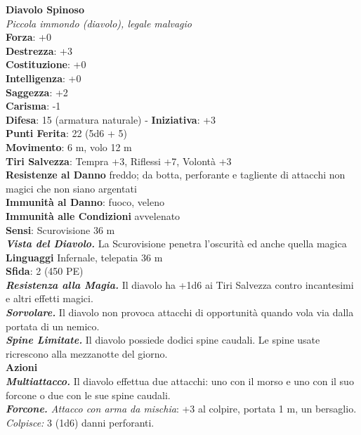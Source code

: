 \begin{multicols}{2}
\medskip\textbf{Diavolo Spinoso}\\
\emph{Piccola immondo (diavolo), legale malvagio}\\
\textbf{Forza}: +0\\
\textbf{Destrezza}: +3\\
\textbf{Costituzione}: +0\\
\textbf{Intelligenza}: +0\\
\textbf{Saggezza}: +2\\
\textbf{Carisma}: -1\\
\textbf{Difesa}: 15 (armatura naturale) - \textbf{Iniziativa}: +3\\
\textbf{Punti Ferita}: 22 (5d6 + 5)\\
\textbf{Movimento}: 6 m, volo 12 m\\
\textbf{Tiri Salvezza}: Tempra +3, Riflessi +7, Volontà +3\\
\textbf{Resistenze al Danno} freddo; da botta, perforante e tagliente di attacchi non magici che non siano argentati\\
\textbf{Immunità al Danno}: fuoco, veleno \\
\textbf{Immunità alle Condizioni} avvelenato\\
\textbf{Sensi}: Scurovisione 36 m\\
\emph{\textbf{Vista del Diavolo.}} La Scurovisione penetra l'oscurità ed anche quella magica\\
\textbf{Linguaggi} Infernale, telepatia 36 m \\
\textbf{Sfida}: 2 (450 PE)\smallskip\\
\emph{\textbf{Resistenza alla Magia.}} Il diavolo ha +1d6 ai Tiri Salvezza contro incantesimi e altri effetti magici.\\
\emph{\textbf{Sorvolare.}} Il diavolo non provoca attacchi di opportunità quando vola via dalla portata di un nemico.\\
\emph{\textbf{Spine Limitate.}} Il diavolo possiede dodici spine caudali. Le spine usate ricrescono alla mezzanotte del giorno.\\
\smallskip\textbf{Azioni}\\
\emph{\textbf{Multiattacco.}} Il diavolo effettua due attacchi: uno con il morso e uno con il suo forcone o due con le sue spine caudali.\\
\emph{\textbf{Forcone.} Attacco con arma da mischia}: +3 al colpire, portata 1 m, un bersaglio.\\
\emph{Colpisce:} 3 (1d6) danni perforanti. \\

\end{multicols}
